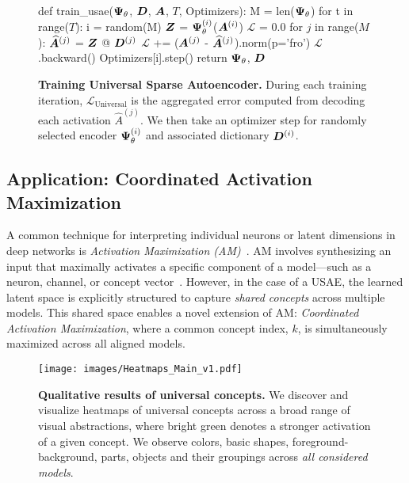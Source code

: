 \begin{figure}[h]
\centering
\noindent\begin{minipage}{0.45\textwidth}
\begin{RoundedListing}
def train_usae($\bm{\Psi}_{\theta}$, $\bm{D}$, $\bm{A}$, $T$, Optimizers):
    M = len($\bm{\Psi}_{\theta}$)
    for t in range($T$):
        i = random(M)
        $\bm{Z}$ = $\bm{\Psi}_{\theta}^{(i)}$($\bm{A}^{(i)}$)
        $\mathcal{L}$ = $0.0$
        for $j$ in range($M$):
            $\widehat{\bm{A}}^{(j)}$ = $\bm{Z}$ @ $\bm{D}^{(j)}$
            $\mathcal{L}$ += ($\bm{A}^{(j)}$ - $\widehat{\bm{A}}^{(j)}$).norm(p='fro')
        $\mathcal{L}$.backward()
        Optimizers[i].step()
    return $\bm{\Psi}_{\theta}$, $\bm{D}$
\end{RoundedListing}
\end{minipage}
\caption{\textbf{Training Universal Sparse Autoencoder.} During each training iteration, $\mathcal{L}_{\text{Universal}}$ is the aggregated error computed from decoding each activation $\widehat{A}^{(j)}$. We then take an optimizer step for randomly selected encoder $\bm{\Psi}_{\theta}^{(i)}$ and associated dictionary $\bm{D}^{(i)}$. }
\label{code:usae}
\vspace{-7mm}
\end{figure}






\subsection{Application: Coordinated Activation Maximization}\label{sec:application}
A common technique for interpreting individual neurons or latent dimensions in deep networks is \textit{Activation Maximization (AM)}~\cite{olah2017feature, tsipras2018robustness, santurkar2019image, engstrom2019adversarial, ghiasi2021plug, ghiasi2022vision, fel2023unlocking, hamblin2024feature}. AM involves synthesizing an input that maximally activates a specific component of a model—such as a neuron, channel, or concept vector~\cite{cogsci1986, mahendran2015understanding, kim2018interpretability, fel2023craft}. However, in the case of a USAE, the learned latent space is explicitly structured to capture \textit{shared concepts} across multiple models. This shared space enables a novel extension of AM: \textit{Coordinated Activation Maximization}, where a common concept index, $k$, is simultaneously maximized across all aligned models.


\begin{figure*}[t]
    \centering
    \texttt{[image: images/Heatmaps\_Main\_v1.pdf]}
    \vspace{-12pt}
\caption{\textbf{Qualitative results of universal concepts.} We discover and visualize heatmaps of universal concepts across a broad range of visual abstractions, where bright green denotes a stronger activation of a given concept. We observe colors, basic shapes, foreground-background, parts, objects and their groupings across \textit{all considered models}. 
    }
    \label{fig:qualitative_universal}
        \vspace{-12pt}
\end{figure*}

